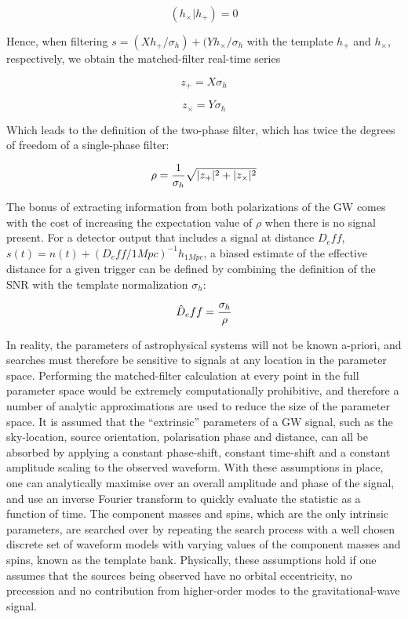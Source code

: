 \documentclass[binding=0.6cm, LaM]{sapthesis}
\begin{document}
		\begin{equation}
			(h_{\times}|h_{+}) = 0
		\end{equation}
 
	Hence, when filtering  $s = (Xh_{+}/\sigma_{h}) + (Y h_{\times}/\sigma_{h}$ 
	with the template $h_{+}$ and $h_{\times}$, 
	respectively, we obtain the matched-filter real-time series
 
		\begin{equation}
			z_{+} = X\sigma_{h}
		\end{equation}

		\begin{equation}
			z_{\times} = Y \sigma_{h} 
		\end{equation}

	Which leads to the definition of the two-phase filter, 
	which has twice the degrees of freedom of a single-phase filter:

		\begin{equation}
			\rho = {1 \over \sigma_h} \sqrt{|z_{+}| ^2+ |z_{\times}|^2}
		\end{equation}

	The bonus of extracting information from both polarizations of the GW 
	comes with the cost of increasing the expectation value of $\rho$ when there is no signal present. 
	For a detector output that includes a signal at distance $D_eff$, 
	$s(t) = n(t) + (D_eff/1 Mpc)^{-1}h_{1Mpc}$, 
	a biased estimate of the effective distance for a given trigger 
	can be defined by combining the definition of the SNR with the template normalization $\sigma_h$:

		\begin{equation}
			\hat D_eff = {{\sigma_h} \over {\rho}}
		\end{equation}

	In reality, the parameters of astrophysical systems will not be known a-priori, 
	and searches must therefore be sensitive to signals at any location in the parameter space. 
	Performing the matched-filter calculation at every point in the full parameter space 
	would be extremely computationally prohibitive, 
	and therefore a number of analytic approximations are used to reduce the size of the parameter space. 
	It is assumed that the “extrinsic” parameters of a GW signal, 
	such as the sky-location, source orientation, polarisation phase and distance, 
	can all be absorbed by applying a constant phase-shift, 
	constant time-shift and a constant amplitude scaling to the observed waveform. 
	With these assumptions in place, 
	one can analytically maximise over an overall amplitude and phase of the signal, 
	and use an inverse Fourier transform to quickly evaluate the statistic as a function of time. 
	The component masses and spins, 
	which are the only intrinsic parameters, 
	are searched over by repeating the search process with a well chosen discrete set of waveform models 
	with varying values of the component masses and spins, 
	known as the template bank. 
	Physically, these assumptions hold if one assumes that the sources being observed 
	have no orbital eccentricity, no precession and no contribution from higher-order modes 
	to the gravitational-wave signal. 
\end{document}
